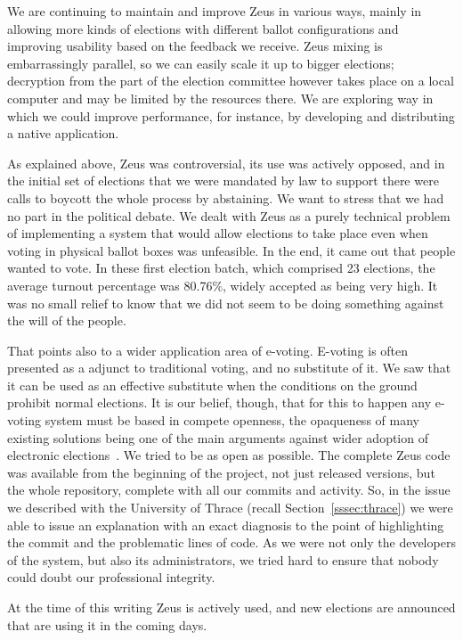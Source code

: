 \documentclass[letterpaper,10pt]{article}
\begin{document}
We are continuing to maintain and improve Zeus in various ways, mainly
in allowing more kinds of elections with different ballot
configurations and improving usability based on the feedback we
receive. Zeus mixing is embarrassingly parallel, so we can easily scale
it up to bigger elections; decryption from the part of the election
committee however takes place on a local computer and may be limited
by the resources there. We are exploring way in which we could improve
performance, for instance, by developing and distributing a native
application.

As explained above, Zeus was controversial, its use was actively
opposed, and in the initial set of elections that we were mandated by
law to support there were calls to boycott the whole process by
abstaining. We want to stress that we had no part in the political
debate. We dealt with Zeus as a purely technical problem of
implementing a system that would allow elections to take place even
when voting in physical ballot boxes was unfeasible. In the end, it
came out that people wanted to vote. In these first election batch,
which comprised 23 elections, the average turnout percentage was
80.76\%, widely accepted as being very high. It was no small relief to
know that we did not seem to be doing something against the will of
the people.

That points also to a wider application area of e-voting. E-voting is
often presented as a adjunct to traditional voting, and no substitute
of it. We saw that it can be used as an effective substitute when the
conditions on the ground prohibit normal elections. It is our belief,
though, that for this to happen any e-voting system must be based in
compete openness, the opaqueness of many existing solutions being one
of the main arguments against wider adoption of electronic
elections~\cite{simons:2012,jones:2012}. We tried to be as open as
possible. The complete Zeus code was available from the beginning of
the project, not just released versions, but the whole repository,
complete with all our commits and activity. So, in the issue we
described with the University of Thrace (recall
Section~\ref{sssec:thrace}) we were able to issue an explanation with
an exact diagnosis to the point of highlighting the commit and the
problematic lines of code. As we were not only the developers of the
system, but also its administrators, we tried hard to ensure that
nobody could doubt our professional integrity.

At the time of this writing Zeus is actively used, and new elections
are announced that are using it in the coming days.
\end{document}
